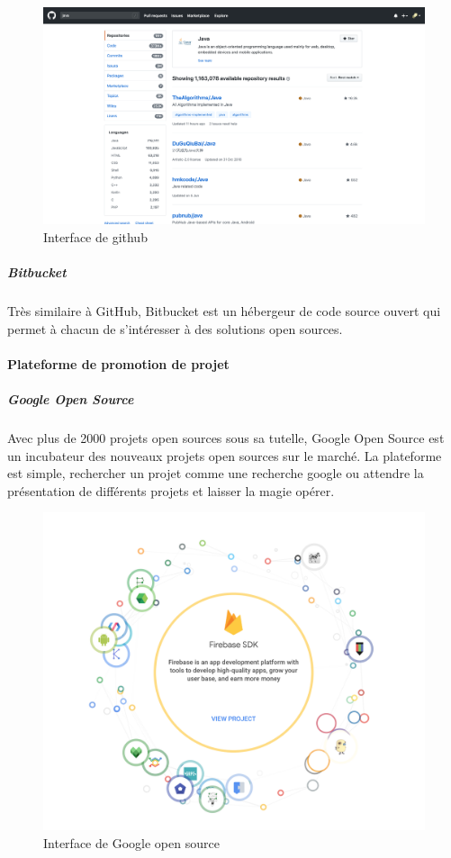 				\begin{figure}[!htb]
					\center
					\includegraphics[scale=0.20]{./img/gh_os}
					\caption{Interface de github}					
				\end{figure}
			
				\subparagraph{Bitbucket\\}
				Très similaire à GitHub, Bitbucket est un hébergeur de code source ouvert qui permet à chacun de s’intéresser à des solutions open sources.

			\paragraph{Plateforme de promotion de projet}

				\subparagraph{Google Open Source\\}

				Avec plus de 2000 projets open sources sous sa tutelle, Google Open Source est un incubateur des nouveaux projets open sources sur le marché.
				La plateforme est simple, rechercher un projet comme une recherche google ou attendre la présentation de différents projets et laisser la magie opérer.

				\begin{figure}[!htb]
					\center
					\includegraphics[scale=0.35]{./img/google_os}
					\caption{Interface de Google open source}					
				\end{figure}

